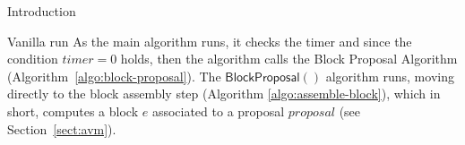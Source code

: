 \documentclass[10pt,a4paper]{article}
\begin{document}
\begin{section}{Introduction}
\begin{subsection}{Vanilla run}
As the main algorithm runs, it checks the timer and since the condition $timer=0$ holds,
then the algorithm calls the Block Proposal Algorithm (Algorithm~\ref{algo:block-proposal}).
The $\mathsf{BlockProposal}()$ algorithm runs, moving directly to the 
block assembly step (Algorithm \ref{algo:assemble-block}), which in short, computes a 
block $e$ associated to a proposal $proposal$ (see Section~\ref{sect:avm}).
%
%
%

\end{subsection}
\end{section}
\end{document}
